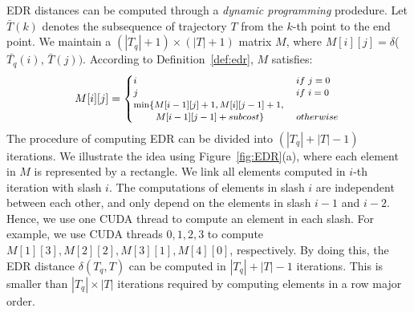\documentclass[10pt,conference,letterpaper]{IEEEtran}
\newcommand{\edr}{{\delta}\xspace}
\newcommand{\bigoh}{{\rm O}\xspace}
\begin{document}
EDR distances can be computed through a \emph{dynamic programming} prodedure. Let $\bar{T}(k)$ denotes the subsequence of trajectory $T$ from the $k$-th point to the end point.
We maintain a $(|T_q|+1)\times (|T|+1)$ matrix $M$, where $M[i][j]=\edr$($\bar{T_q}(i)$, $\bar{T}(j))$. According to Definition~\ref{def:edr}, $M$ satisfies:
\begin{equation}
\scriptsize
M[i][j]=
\begin{cases}
i &\mbox{~if~}j=0\\
j &\mbox{~if~}i=0\\
\min\{M[i-1][j]+1, M[i][j-1]+1, &\\
~~~~~~~M[i-1][j-1]+subcost \} &\mbox{~otherwise~}
\end{cases}
\end{equation}
%
%
The procedure of computing EDR can be divided into $(|T_q|+|T|-1)$ iterations. We illustrate the idea using Figure~\ref{fig:EDR}(a), where each element in $M$ is represented by a rectangle. We link all elements computed in $i$-th iteration with slash $i$. The computations of elements in slash $i$ are independent between each other, and only depend on the elements in slash $i-1$ and $i-2$.
Hence, we use one CUDA thread to compute an element in each slash.
For example, we use CUDA threads $0, 1,2,3$ to compute $M[1][3],M[2][2],M[3][1], M[4][0]$, respectively.
By doing this, the EDR distance $\edr(T_q, T)$ can be computed in $|T_q|+|T|-1$ iterations. This is smaller than $|T_q|\times |T|$ iterations required by computing elements in a row major order.
\end{document}
